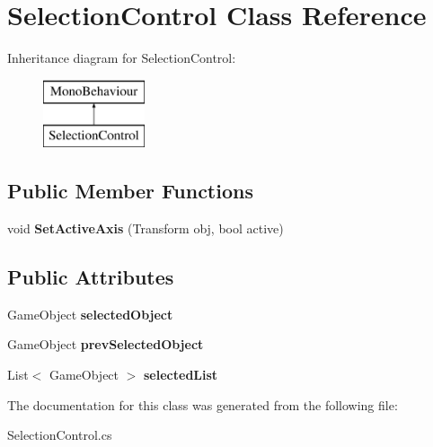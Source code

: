 \hypertarget{class_selection_control}{}\section{Selection\+Control Class Reference}
\label{class_selection_control}
Inheritance diagram for Selection\+Control\+:\begin{figure}[H]
\begin{center}
\leavevmode
\includegraphics[height=2.000000cm]{class_selection_control}
\end{center}
\end{figure}
\subsection*{Public Member Functions}
\begin{DoxyCompactItemize}
\item 
\mbox{\label{class_selection_control_af45a0f8f9cf7f200e423971f190d8bbf}} 
void {\bfseries Set\+Active\+Axis} (Transform obj, bool active)
\end{DoxyCompactItemize}
\subsection*{Public Attributes}
\begin{DoxyCompactItemize}
\item 
\mbox{\label{class_selection_control_ad7c2fe8ddd7a667218189d834d875437}} 
Game\+Object {\bfseries selected\+Object}
\item 
\mbox{\label{class_selection_control_ae96fdc035b8d3583afa22e85a35baf59}} 
Game\+Object {\bfseries prev\+Selected\+Object}
\item 
\mbox{\label{class_selection_control_a91300a4e40f06901799b7b582f53b398}} 
List$<$ Game\+Object $>$ {\bfseries selected\+List}
\end{DoxyCompactItemize}


The documentation for this class was generated from the following file\+:\begin{DoxyCompactItemize}
\item 
Selection\+Control.\+cs\end{DoxyCompactItemize}
